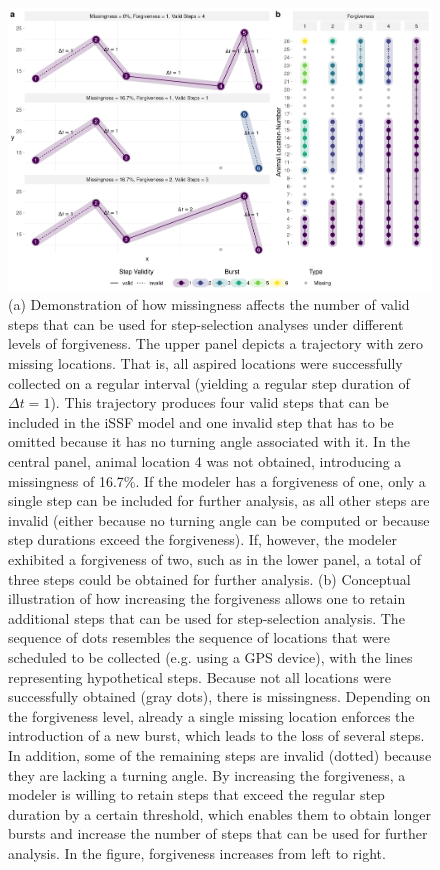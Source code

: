 \documentclass[../FinalThesis.tex]{subfiles}
\begin{document}
\begin{figure}[htpb]
  \begin{center}
  \includegraphics[width = \textwidth]{Figures/Overview.png}
  \caption{(a) Demonstration of how missingness affects the number of valid
  steps that can be used for step-selection analyses under different levels of
  forgiveness. The upper panel depicts a trajectory with zero missing locations.
  That is, all aspired locations were successfully collected on a regular
  interval (yielding a regular step duration of $\Delta t = 1$). This trajectory
  produces four valid steps that can be included in the iSSF model and one
  invalid step that has to be omitted because it has no turning angle associated
  with it. In the central panel, animal location 4 was not obtained, introducing
  a missingness of 16.7\%. If the modeler has a forgiveness of one, only a
  single step can be included for further analysis, as all other steps are
  invalid (either because no turning angle can be computed or because step
  durations exceed the forgiveness). If, however, the modeler exhibited a
  forgiveness of two, such as in the lower panel, a total of three steps could
  be obtained for further analysis. (b) Conceptual illustration of how
  increasing the forgiveness allows one to retain additional steps that can be
  used for step-selection analysis. The sequence of dots resembles the sequence
  of locations that were scheduled to be collected (e.g. using a GPS device),
  with the lines representing hypothetical steps. Because not all locations were
  successfully obtained (gray dots), there is missingness. Depending on the
  forgiveness level, already a single missing location enforces the introduction
  of a new burst, which leads to the loss of several steps. In addition, some of
  the remaining steps are invalid (dotted) because they are lacking a turning
  angle. By increasing the forgiveness, a modeler is willing to retain steps
  that exceed the regular step duration by a certain threshold, which enables
  them to obtain longer bursts and increase the number of steps that can be used
  for further analysis. In the figure, forgiveness increases from left to
  right.}
  \label{Overview}
  \end{center}
\end{figure}
\end{document}
